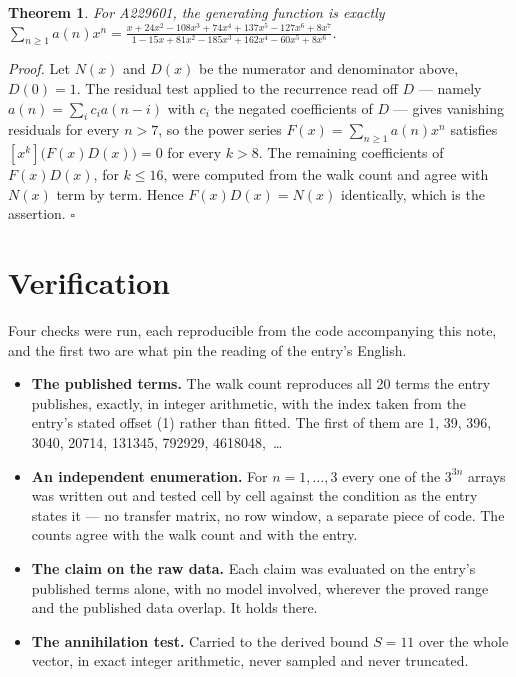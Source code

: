 \documentclass[11pt]{article}
\newtheorem{theorem}{Theorem}
\theoremstyle{definition}
\begin{document}
\begin{theorem} For A229601, the generating function is exactly $\sum_{n\ge 1} a(n)x^n = \frac{x + 24x^{2} - 108x^{3} + 74x^{4} + 137x^{5} - 127x^{6} + 8x^{7}}{1 - 15x + 81x^{2} - 185x^{3} + 162x^{4} - 60x^{5} + 8x^{6}}$.\end{theorem}

{\itshape Proof.} Let $N(x)$ and $D(x)$ be the numerator and denominator above, $D(0)=1$. The residual test applied to the recurrence read off $D$ --- namely $a(n) = \sum_i c_i a(n-i)$ with $c_i$ the negated coefficients of $D$ --- gives vanishing residuals for every $n > 7$, so the power series $F(x)=\sum_{n\ge 1}a(n)x^n$ satisfies $[x^k]\bigl(F(x)D(x)\bigr) = 0$ for every $k > 8$. The remaining coefficients of $F(x)D(x)$, for $k \le 16$, were computed from the walk count and agree with $N(x)$ term by term. Hence $F(x)D(x) = N(x)$ identically, which is the assertion. $\square$

\section{Verification}

Four checks were run, each reproducible from the code accompanying this note, and the first two are what pin the reading of the entry's English.

\begin{itemize}

\item {\bfseries The published terms.} The walk count reproduces all 20 terms the entry publishes, exactly, in integer arithmetic, with the index taken from the entry's stated offset (1) rather than fitted. The first of them are 1, 39, 396, 3040, 20714, 131345, 792929, 4618048,~\dots

\item {\bfseries An independent enumeration.} For $n = 1,\dots,3$ every one of the $3^{3n}$ arrays was written out and tested cell by cell against the condition as the entry states it --- no transfer matrix, no row window, a separate piece of code. The counts agree with the walk count and with the entry.

\item {\bfseries The claim on the raw data.} Each claim was evaluated on the entry's published terms alone, with no model involved, wherever the proved range and the published data overlap. It holds there.

\item {\bfseries The annihilation test.} Carried to the derived bound $S = 11$ over the whole vector, in exact integer arithmetic, never sampled and never truncated.

\end{itemize}
\end{document}
